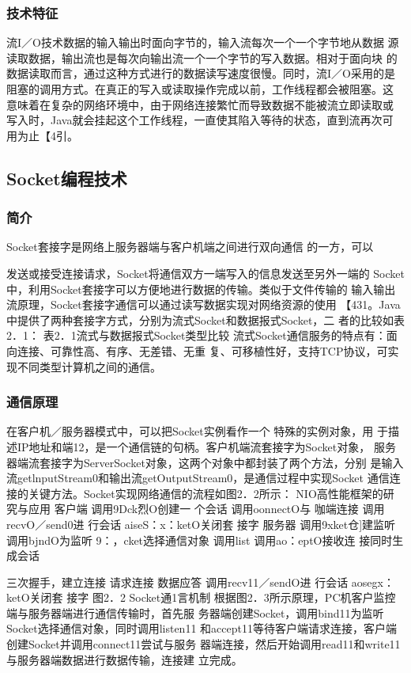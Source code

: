 \subsubsection*{技术特征}
流I／O技术数据的输入输出时面向字节的，输入流每次一个一个字节地从数据
源读取数据，输出流也是每次向输出流一个一个字节的写入数据。相对于面向块
的数据读取而言，通过这种方式进行的数据读写速度很慢。同时，流I／O采用的是
阻塞的调用方式。在真正的写入或读取操作完成以前，工作线程都会被阻塞。这
意味着在复杂的网络环境中，由于网络连接繁忙而导致数据不能被流立即读取或
写入时，Java就会挂起这个工作线程，一直使其陷入等待的状态，直到流再次可
用为止【4引。
\subsection*{Socket编程技术}
\subsubsection*{简介}
Socket套接字是网络上服务器端与客户机端之间进行双向通信
的一方，可以

发送或接受连接请求，Socket将通信双方一端写入的信息发送至另外一端的
Socket中，利用Socket套接字可以方便地进行数据的传输。类似于文件传输的
输入输出流原理，Socket套接字通信可以通过读写数据实现对网络资源的使用
【431。Java中提供了两种套接字方式，分别为流式Socket和数据报式Socket，二
者的比较如表2．1：
表2．1流式与数据报式Socket类型比较
流式Socket通信服务的特点有：面向连接、可靠性高、有序、无差错、无重
复、可移植性好，支持TCP协议，可实现不同类型计算机之间的通信。
\subsubsection*{通信原理}

在客户机／服务器模式中，可以把Socket实例看作一个
特殊的实例对象，用
于描述IP地址和端12，是一个通信链的句柄。客户机端流套接字为Socket对象，
服务器端流套接字为ServerSocket对象，这两个对象中都封装了两个方法，分别
是输入流getlnputStream0和输出流getOutputStream0，是通信过程中实现Socket
通信连接的关键方法。Socket实现网络通信的流程如图2．2所示：
NIO高性能框架的研究与应用
客户端
调用9Dck烈O创建一
个会话
调用oonnectO与
咖端连接
调用recvO／send0进
行会话
aiseS：x：ketO关闭套
接字
服务器
调用9xket仓]建监听
调用bjndO为监听
9：，cket选择通信对象
调用list
调用ao：eptO接收连
接同时生成会话


三次握手，建立连接
请求连接
数据应答
调用recv11／sendO进
行会话
aosegx：ketO关闭套
接字
图2．2 Socket通1言机制
根据图2．3所示原理，PC机客户监控端与服务器端进行通信传输时，首先服
务器端创建Socket，调用bind11为监听Socket选择通信对象，同时调用listen11
和accept11等待客户端请求连接，客户端创建Socket并调用connect11尝试与服务
器端连接，然后开始调用read11和write11与服务器端数据进行数据传输，连接建
立完成。
